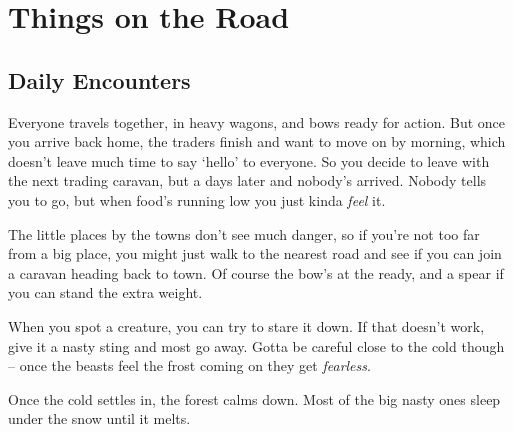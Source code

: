 \section{Things on the Road}
\label{randomEncounters}

\begin{multicols}{2}

\subsection{Daily Encounters}

\begin{speechtext}
  Everyone travels together, in heavy wagons, and bows ready for action.
  But once you arrive back home, the traders finish and want to move on by morning, which doesn't leave much time to say `hello' to everyone.
  So you decide to leave with the next trading caravan, but a days later and nobody's arrived.
  Nobody tells you to go, but when food's running low you just kinda \emph{feel} it.

  The little places by the towns don't see much danger, so if you're not too far from a big place, you might just walk to the nearest road and see if you can join a caravan heading back to town.
  Of course the bow's at the ready, and a spear if you can stand the extra weight.

  When you spot a creature, you can try to stare it down.
  If that doesn't work, give it a nasty sting and most go away.
  Gotta be careful close to the cold though -- once the beasts feel the frost coming on they get \emph{fearless}.

  Once the cold settles in, the forest calms down.
  Most of the big nasty ones sleep under the snow until it melts.
\end{speechtext}


\begin{figure*}[b!]


\end{figure*}
\end{multicols}
